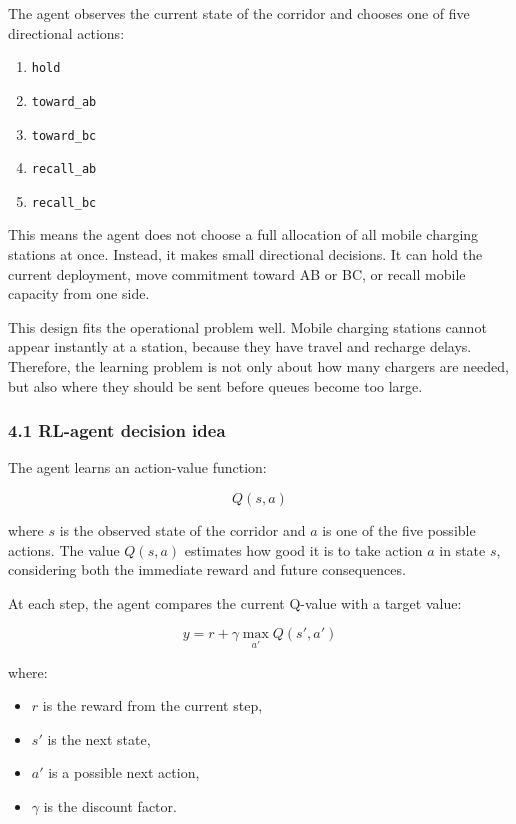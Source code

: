 \documentclass[11pt]{article}
\providecommand{\tightlist}{%
      \setlength{\itemsep}{0pt}\setlength{\parskip}{0pt}}
\begin{document}
The agent observes the current state of the corridor and chooses one of
five directional actions:

\begin{enumerate}
\def\labelenumi{\arabic{enumi}.}
\tightlist
\item
  \texttt{hold}
\item
  \texttt{toward\_ab}
\item
  \texttt{toward\_bc}
\item
  \texttt{recall\_ab}
\item
  \texttt{recall\_bc}
\end{enumerate}

This means the agent does not choose a full allocation of all mobile
charging stations at once. Instead, it makes small directional
decisions. It can hold the current deployment, move commitment toward AB
or BC, or recall mobile capacity from one side.

This design fits the operational problem well. Mobile charging stations
cannot appear instantly at a station, because they have travel and
recharge delays. Therefore, the learning problem is not only about how
many chargers are needed, but also where they should be sent before
queues become too large.

\subsubsection{4.1 RL-agent decision idea}\label{rl-agent-decision-idea}

The agent learns an action-value function:

\[
Q(s,a)
\]

where \(s\) is the observed state of the corridor and \(a\) is one of
the five possible actions. The value \(Q(s,a)\) estimates how good it is
to take action \(a\) in state \(s\), considering both the immediate
reward and future consequences.

At each step, the agent compares the current Q-value with a target
value:

\[
y = r + \gamma \max_{a'} Q(s', a')
\]

where:

\begin{itemize}
\tightlist
\item
  \(r\) is the reward from the current step,
\item
  \(s'\) is the next state,
\item
  \(a'\) is a possible next action,
\item
  \(\gamma\) is the discount factor.
\end{itemize}
\end{document}
